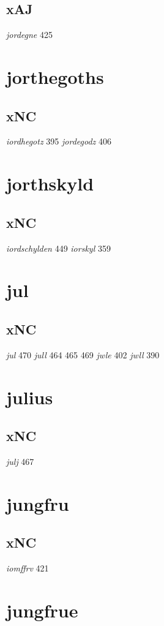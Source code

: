 \documentclass[a4paper,twocolumn]{article}
\begin{document}
\subsection{xAJ}
\label{sec:orgcd182d0}
\emph{jordegne} 425 
\section{jorthegoths}
\label{sec:orgf6ec806}
\subsection{xNC}
\label{sec:org7c7cc0f}
\emph{iordhegotz} 395 \emph{jordegodz} 406 
\section{jorthskyld}
\label{sec:org9116a73}
\subsection{xNC}
\label{sec:org1a527f6}
\emph{iordschylden} 449 \emph{iorskyl} 359 
\section{jul}
\label{sec:org96ea9dc}
\subsection{xNC}
\label{sec:org05c51f0}
\emph{jul} 470 \emph{jull} 464 465 469 \emph{jwle} 402 \emph{jwll} 390 
\section{julius}
\label{sec:org145fdab}
\subsection{xNC}
\label{sec:orgf6a93de}
\emph{julj} 467 
\section{jungfru}
\label{sec:org84fc00e}
\subsection{xNC}
\label{sec:org3cfb7ce}
\emph{iomffrv} 421 
\section{jungfrue}
\label{sec:org6e490f7}
\end{document}
